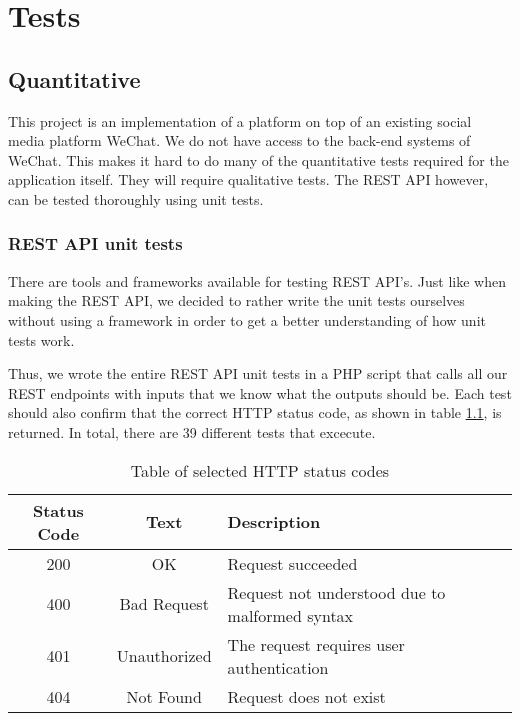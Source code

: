 
\chapter{Tests}
\label{chp:Tests}


\section{Quantitative}

This project is an implementation of a platform on top of an existing social media platform WeChat. We do not have access to the back-end systems of WeChat. This makes it hard to do many of the quantitative tests required for the application itself. They will require qualitative tests. The REST API however, can be tested thoroughly using unit tests. 

\subsection{REST API unit tests}

There are tools and frameworks available for testing REST API's. Just like when making the REST API, we decided to rather write the unit tests ourselves without using a framework in order to get a better understanding of how unit tests work.

Thus, we wrote the entire REST API unit tests in a PHP script that calls all our REST endpoints with inputs that we know what the outputs should be. Each test should also confirm that the correct HTTP status code, as shown in table \ref{tbl:http_status_codes},  is returned. In total, there are 39 different tests that excecute. 

\begin{table}
	\begin{center}
		\begin{tabular}	{ | c | c | p{5cm}|}
		\hline
		Status Code & Text & Description \\ \hline
		200 & OK & Request succeeded \\ \hline
		400 & Bad Request & Request not understood due to malformed syntax \\ \hline
		401 & Unauthorized & The request requires user authentication \\ \hline
		404 & Not Found & Request does not exist \\ \hline
		
		\end{tabular}
		\caption{Table of selected HTTP status codes} 
		\label{tbl:http_status_codes}
	\end{center}
\end{table}



